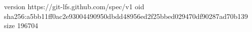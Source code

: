 version https://git-lfs.github.com/spec/v1
oid sha256:a5bb11ff0ac2e93004490950dbdd48956ed2f25bbed029470df90287ad70b139
size 196704
